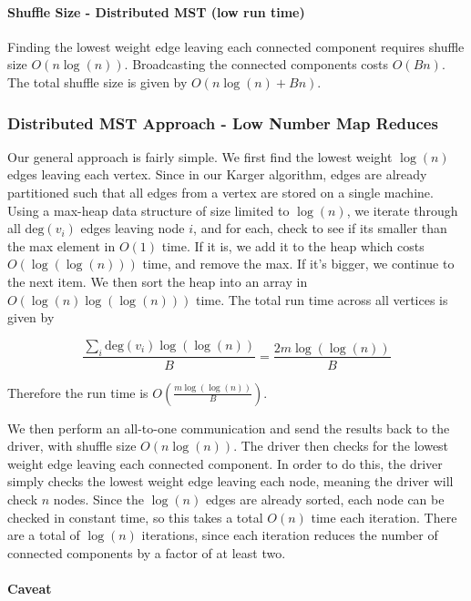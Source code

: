 \documentclass[12pt]{article}
\begin{document}
\paragraph{Shuffle Size - Distributed MST (low run time)}

Finding the lowest weight edge leaving each connected component requires shuffle size $O(n \log(n))$. Broadcasting the connected components costs $O(Bn)$. The total shuffle size is given by $O(n\log(n) + Bn)$.


\subsubsection{Distributed MST Approach - Low Number Map Reduces}

Our general approach is fairly simple. We first find the lowest weight $\log(n)$ edges leaving each vertex. Since in our Karger algorithm, edges are already partitioned such that all edges from a vertex are stored on a single machine. Using a max-heap data structure of size limited to $\log(n)$, we iterate through all $\text{deg}(v_i)$ edges leaving node $i$, and for each, check to see if its smaller than the max element in $O(1)$ time. If it is, we add it to the heap which costs $O(\log(\log(n)))$ time, and remove the max. If it's bigger, we continue to the next item. We then sort the heap into an array in $O(\log(n) \log(\log(n)))$ time. The total run time across all vertices is given by

\[
\frac{\sum_{i} \text{deg}(v_i) \log(\log(n))}{B} = \frac{2m \log(\log(n))}{B}
\]

Therefore the run time is $O(\frac{m \log(\log(n))}{B})$.

We then perform an all-to-one communication and send the results back to the driver, with shuffle size $O(n \log(n))$. The driver then checks for the lowest weight edge leaving each connected component. In order to do this, the driver simply checks the lowest weight edge leaving each node, meaning the driver will check $n$ nodes. Since the $\log(n)$ edges are already sorted, each node can be checked in constant time, so this takes a total $O(n)$ time each iteration. There are a total of $\log(n)$ iterations, since each iteration reduces the number of connected components by a factor of at least two. 

\paragraph{Caveat} 
\end{document}
